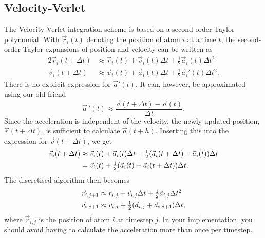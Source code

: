 \documentclass[11pt,british,a4paper]{report}
\begin{document}
\subsection{Velocity-Verlet}\label{app:verlet}
The Velocity-Verlet integration scheme is based on a second-order Taylor polynomial. With \(\vec{r}_i(t)\) denoting the position of atom \(i\) at a time \(t\), the second-order Taylor expansions of position and velocity can be written as
\begin{alignat*}{2}
    \vec{r}_i(t+\Delta t) &\approx \vec{r}_i(t) + \vec{v}_i(t)\Delta t + \tfrac{1}{2}\vec{a}_i(t)\Delta t^2\\
    \vec{v}_i(t+\Delta t) &\approx \vec{v}_i(t) + \vec{a}_i(t)\Delta t + \tfrac{1}{2}\vec{a}_i'(t)\Delta t^2.
\end{alignat*}
There is no explicit expression for \(\vec{a}'(t)\). It can, however, be approximated using our old friend
\[
\vec{a}\,'(t)\approx\frac{\vec{a}(t+\Delta t)-\vec{a}(t)}{\Delta t}.
\]
Since the acceleration is independent of the velocity, the newly updated position, \(\vec{r}(t+\Delta t)\), is sufficient to calculate \(\vec{a}(t+h)\). Inserting this into the expression for \(\vec{v}(t+\Delta t)\), we get
\begin{alignat*}{2}
    \vec{v}_i(t+\Delta t) &\approx \vec{v}_i(t) + \vec{a}_i(t)\Delta t + \tfrac{1}{2}\qty(\vec{a}_i(t+\Delta t)-\vec{a}_i(t))\Delta t\\
    &= \vec{v}_i(t) + \tfrac{1}{2}\qty(\vec{a}_i(t)+\vec{a}_i(t+\Delta t))\Delta t.
\end{alignat*}
The discretised algorithm then becomes
\begin{alignat*}{2}
    \vec{r}_{i,j+1} &\approx \vec{r}_{i,j} + \vec{v}_{i,j}\Delta t + \tfrac{1}{2}\vec{a}_{i,j}\Delta t^2\\
    \vec{v}_{i,j+1} &\approx \vec{v}_{i,j} + \tfrac{1}{2}\qty(\vec{a}_{i,j} + \vec{a}_{i,j+1})\Delta t,
\end{alignat*}
where \(\vec{r}_{i,j}\) is the position of atom \(i\) at timestep \(j\). In your implementation, you should avoid having to calculate the acceleration more than once per timestep.



\nocite{*}
\printbibliography{}
\end{document}
